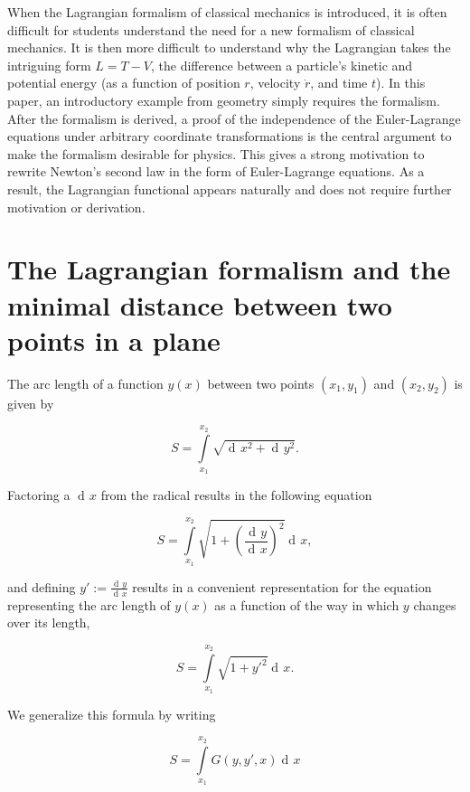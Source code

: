 \documentclass{article}
\DeclareMathOperator{\dd}{d\!}
\begin{document}
When the Lagrangian formalism of classical mechanics is introduced, it is often difficult for students understand the need for a new formalism of classical mechanics. It is then more difficult to understand why the Lagrangian takes the intriguing form $L=T-V$, the difference between a particle's kinetic and potential energy (as a function of position $r$, velocity $\dot{r}$, and time $t$). In this paper, an introductory example from geometry simply requires the formalism. After the formalism is derived, a proof of the independence of the Euler-Lagrange equations under arbitrary coordinate transformations is the central argument to make the formalism desirable for physics. This gives a strong motivation to rewrite Newton's second law in the form of Euler-Lagrange equations. As a result, the Lagrangian functional appears naturally and does not require further motivation or derivation.

\section{The Lagrangian formalism and the minimal distance between two points in a plane \cite{Klopper}}\label{distance}

The arc length of a function $y(x)$ between two points $(x_1,y_1)$ and $(x_2,y_2)$ is given by

\begin{equation}
S=\int\limits_{x_1}^{x_2}\sqrt{\dd x^2 + \dd y^2}.
\end{equation}

Factoring a $\dd x$ from the radical results in the following equation

\begin{equation}
S= \int\limits_{x_1}^{x_2}\sqrt{1 + \left(\frac{\dd y}{\dd x}\right)^2} \dd x,
\end{equation}

and defining $y' := \frac{\dd y}{\dd x}$ results in a convenient representation for the equation representing the arc length of $y(x)$ as a function of the way in which $y$ changes over its length, %

\begin{equation}
S = \int\limits_{x_1}^{x_2}\sqrt{1 + y'^2} \dd x.
\end{equation}

We generalize this formula by writing

\begin{equation}
S=\int\limits_{x_1}^{x_2} G(y,y',x) \dd x
\end{equation}
\end{document}
